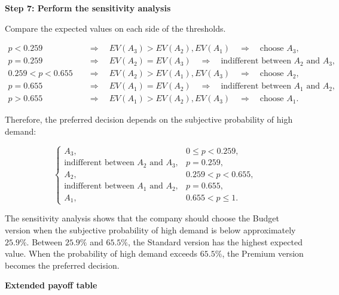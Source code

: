	\textbf{Step 7: Perform the sensitivity analysis}
	
	Compare the expected values on each side of the thresholds.
	
	$$
	\begin{aligned}
		p<0.259
		&\quad\Rightarrow\quad
		EV(A_3)>EV(A_2),EV(A_1)
		\quad\Rightarrow\quad
		\text{choose }A_3,
		\\
		p=0.259
		&\quad\Rightarrow\quad
		EV(A_2)=EV(A_3)
		\quad\Rightarrow\quad
		\text{indifferent between }A_2\text{ and }A_3,
		\\
		0.259<p<0.655
		&\quad\Rightarrow\quad
		EV(A_2)>EV(A_1),EV(A_3)
		\quad\Rightarrow\quad
		\text{choose }A_2,
		\\
		p=0.655
		&\quad\Rightarrow\quad
		EV(A_1)=EV(A_2)
		\quad\Rightarrow\quad
		\text{indifferent between }A_1\text{ and }A_2,
		\\
		p>0.655
		&\quad\Rightarrow\quad
		EV(A_1)>EV(A_2),EV(A_3)
		\quad\Rightarrow\quad
		\text{choose }A_1.
	\end{aligned}
	$$
	
	Therefore, the preferred decision depends on the subjective probability
	of high demand:
	
	$$
	\boxed{
		\begin{cases}
			A_3, & 0\leq p<0.259,\\
			\text{indifferent between }A_2\text{ and }A_3,
			& p=0.259,\\
			A_2, & 0.259<p<0.655,\\
			\text{indifferent between }A_1\text{ and }A_2,
			& p=0.655,\\
			A_1, & 0.655<p\leq1.
	\end{cases}}
	$$
	
	The sensitivity analysis shows that the company should choose the Budget
	version when the subjective probability of high demand is below approximately
	$25.9\%$. Between $25.9\%$ and $65.5\%$, the Standard version has the highest
	expected value. When the probability of high demand exceeds $65.5\%$, the
	Premium version becomes the preferred decision.
	
	\textbf{Extended payoff table}
	
